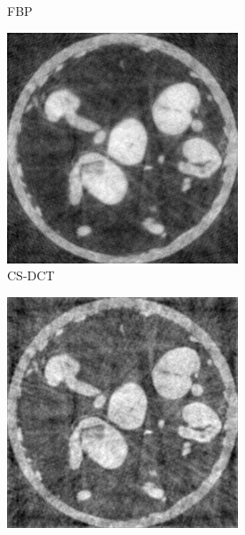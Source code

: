 \documentclass{article}
\begin{document}
\begin{figure}[h]
\begin{subfigure}[b]{0.3\linewidth}
        \caption{FBP}
    \end{subfigure}
    \begin{subfigure}[b]{0.3\linewidth}
        \includegraphics[width=\textwidth]{../images/supplementary/2D_sprouts/55_angles/1/cs_dct.png}
        \caption{CS-DCT}
     \end{subfigure}
    \begin{subfigure}[b]{0.3\linewidth}
        \includegraphics[width=\textwidth]{../images/supplementary/2D_sprouts/55_angles/1/cs_wavelet.png}

\end{subfigure}
\end{figure}
\end{document}
